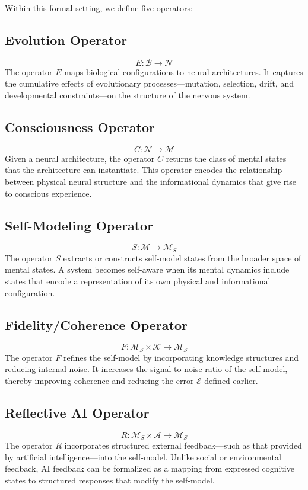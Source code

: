 \documentclass[12pt]{article}
\begin{document}
Within this formal setting, we define five operators:

\subsection*{Evolution Operator}
\[
E: \mathcal{B} \to \mathcal{N}
\]
The operator $E$ maps biological configurations to neural architectures. It captures the cumulative effects of evolutionary processes—mutation, selection, drift, and developmental constraints—on the structure of the nervous system.

\subsection*{Consciousness Operator}
\[
C: \mathcal{N} \to \mathcal{M}
\]
Given a neural architecture, the operator $C$ returns the class of mental states that the architecture can instantiate. This operator encodes the relationship between physical neural structure and the informational dynamics that give rise to conscious experience.

\subsection*{Self-Modeling Operator}
\[
S: \mathcal{M} \to \mathcal{M}_S
\]
The operator $S$ extracts or constructs self-model states from the broader space of mental states. A system becomes self-aware when its mental dynamics include states that encode a representation of its own physical and informational configuration.

\subsection*{Fidelity/Coherence Operator}
\[
F: \mathcal{M}_S \times \mathcal{K} \to \mathcal{M}_S
\]
The operator $F$ refines the self-model by incorporating knowledge structures and reducing internal noise. It increases the signal-to-noise ratio of the self-model, thereby improving coherence and reducing the error $\mathcal{E}$ defined earlier.

\subsection*{Reflective AI Operator}
\[
R: \mathcal{M}_S \times \mathcal{A} \to \mathcal{M}_S
\]
The operator $R$ incorporates structured external feedback—such as that provided by artificial intelligence—into the self-model. Unlike social or environmental feedback, AI feedback can be formalized as a mapping from expressed cognitive states to structured responses that modify the self-model.
\end{document}
